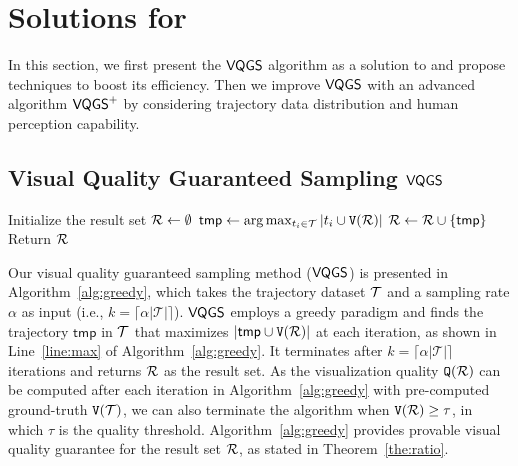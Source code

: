 \section{Solutions for \prob{}}\label{sec:sol}
In this section,  we first present the $\mathsf{VQGS}$ algorithm as a solution to \prob{} and propose techniques to boost its efficiency.
Then we improve $\mathsf{VQGS}$ with an advanced algorithm $\mathsf{VQGS}^+$ by considering trajectory data distribution and human perception capability.


\subsection{Visual Quality Guaranteed Sampling $\mathsf{VQGS}$}\label{sec:greedy}



\begin{algorithm}
    \caption{$\vats(\D, k=\lceil \alpha |\mathcal{T}| \rceil$)} \label{alg:greedy}
    \begin{algorithmic}[1]
    \State Initialize the result set $\mathcal{R} \leftarrow \emptyset$
        \State $\mathsf{tmp} \leftarrow \arg\max_{t_i \in \mathcal{T}} |t_i \cup \mathtt{V}(\mathcal{R})|$ \label{line:max}
        \State $\mathcal{R} \leftarrow \mathcal{R} \cup \{ \mathsf{tmp} \}$
    \EndWhile
    \State Return $\mathcal{R}$
    \end{algorithmic}
\end{algorithm}

Our visual quality guaranteed sampling method ($\mathsf{VQGS}$) is presented in Algorithm~\ref{alg:greedy},
which takes the trajectory dataset $\mathcal{T}$ and a sampling rate $\alpha$ as input (i.e., $k=\lceil \alpha |\mathcal{T}| \rceil$).
$\mathsf{VQGS}$ employs a greedy paradigm and finds the trajectory $\mathsf{tmp}$ in $\mathcal{T}$ that maximizes $| \mathsf{tmp} \cup \mathtt{V}(\mathcal{R})|$ at each iteration, as shown in Line~\ref{line:max} of Algorithm~\ref{alg:greedy}.
It terminates after $k=\lceil \alpha |\mathcal{T}| \rceil$ iterations and returns $\mathcal{R}$ as the result set.
As the visualization quality $\mathtt{Q}(\mathcal{R})$ can be computed after each iteration in Algorithm~\ref{alg:greedy} with pre-computed ground-truth $\mathtt{V}(\mathcal{T})$,
we can also terminate the algorithm when $\mathtt{V}(\mathcal{R})\ge \tau$, in which $\tau$ is the quality threshold. Algorithm~\ref{alg:greedy} provides provable visual quality guarantee for the result set $\mathcal{R}$, as stated in Theorem~\ref{the:ratio}.

